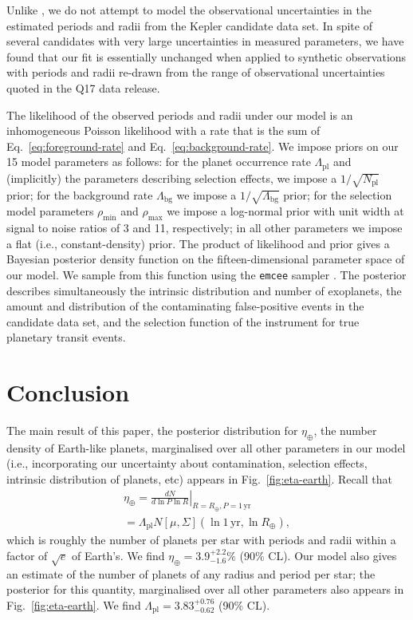 \documentclass[apjl]{emulateapj}
\newcommand{\etaearth}{\eta_\oplus}
\newcommand{\REarth}{R_\oplus}
\newcommand{\Rpl}{\Lambda_\mathrm{pl}}
\newcommand{\Npl}{N_\mathrm{pl}}
\newcommand{\Rbg}{\Lambda_\mathrm{bg}}
\newcommand{\rhomin}{\rho_\mathrm{min}}
\newcommand{\rhomax}{\rho_\mathrm{max}}
\newcommand{\earange}{3.9_{-1.6}^{+2.2}\%}
\newcommand{\rplrange}{3.83_{-0.62}^{+0.76}}
\begin{document}
Unlike \citet{Foreman-Mackey2014}, we do not attempt to model the
observational uncertainties in the estimated periods and radii from
the Kepler candidate data set.  In spite of several candidates with
very large uncertainties in measured parameters, we have found that
our fit is essentially unchanged when applied to synthetic
observations with periods and radii re-drawn from the range of
observational uncertainties quoted in the Q17 data release.

The likelihood of the observed periods and radii under our model is an
inhomogeneous Poisson likelihood \citep{Farr2013,Youdin2011} with a
rate that is the sum of Eq.\ \eqref{eq:foreground-rate} and
Eq.\ \eqref{eq:background-rate}.  We impose priors on our 15 model
parameters as follows: for the planet occurrence rate $\Rpl$ and
(implicitly) the parameters describing selection effects, we impose a
$1/\sqrt{\Npl}$ prior; for the background rate $\Rbg$ we impose a
$1/\sqrt{\Rbg}$ prior; for the selection model parameters $\rhomin$
and $\rhomax$ we impose a log-normal prior with unit width at signal
to noise ratios of 3 and 11, respectively; in all other parameters we
impose a flat (i.e., constant-density) prior.  The product of
likelihood and prior gives a Bayesian posterior density function on
the fifteen-dimensional parameter space of our model.  We sample from
this function using the \texttt{emcee} sampler
\citep{Foreman-Mackey2013}.  The posterior describes simultaneously
the intrinsic distribution and number of exoplanets, the amount and
distribution of the contaminating false-positive events in the
candidate data set, and the selection function of the instrument for
true planetary transit events.

\section{Conclusion}

The main result of this paper, the posterior distribution for
$\etaearth$, the number density of Earth-like planets, marginalised
over all other parameters in our model (i.e., incorporating our
uncertainty about contamination, selection effects, intrinsic
distribution of planets, etc) appears in Fig.\ \ref{fig:eta-earth}.
Recall that
\begin{multline}
  \etaearth = \left. \frac{dN}{d \ln P \ln R} \right|_{R = \REarth, P
    = 1\,\mathrm{yr}} \\ = \Rpl N\left[ \mu, \Sigma \right]\left( \ln
  1\,\mathrm{yr}, \ln \REarth \right),
\end{multline}
which is roughly the number of planets per star with periods and radii
within a factor of $\sqrt{e}$ of Earth's.  We find $\etaearth =
\earange$ (90\% CL).  Our model also gives an estimate of the number
of planets of any radius and period per star; the posterior for this
quantity, marginalised over all other parameters also appears in
Fig.\ \ref{fig:eta-earth}.  We find $\Rpl = \rplrange$ (90\% CL).
\end{document}
